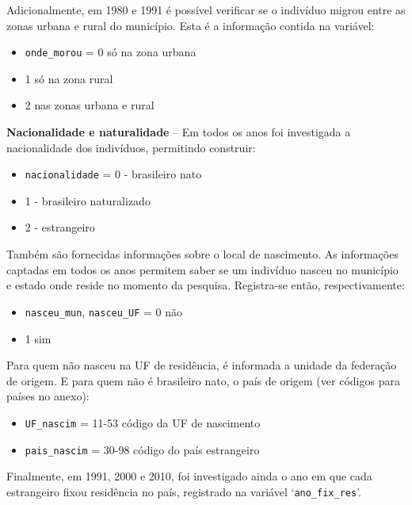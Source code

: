 \documentclass[12pt,a4paper]{article}
\newcommand{\vr}[1]{\texttt{#1}}
\begin{document}
Adicionalmente, em 1980 e 1991 é possível verificar se o indivíduo migrou entre as zonas urbana e rural do município. Esta é a informação contida na variável:
\begin{itemize}
  \item \vr{onde\_morou} = 0 só na zona urbana
  \item 1 só na zona rural
  \item 2 nas zonas urbana e rural
\end{itemize}

\textbf{Nacionalidade e naturalidade} -- Em todos os anos foi investigada a nacionalidade dos indivíduos, permitindo construir:
\begin{itemize}
  \item \vr{nacionalidade} = 0 - brasileiro nato
  \item 1 - brasileiro naturalizado
  \item 2 - estrangeiro
\end{itemize}

Também são fornecidas informações sobre o local de nascimento. As informações captadas em todos os anos permitem saber se um indivíduo nasceu no município e estado onde reside no momento da pesquisa. Registra-se então, respectivamente:
\begin{itemize}
  \item \vr{nasceu\_mun}, \vr{nasceu\_UF} = 0 não
  \item 1 sim
\end{itemize}

Para quem não nasceu na UF de residência, é informada a unidade da federação de origem. E para quem não é brasileiro nato, o país de origem (ver códigos para países no anexo):
\begin{itemize}
  \item \vr{UF\_nascim} = 11-53 código da UF de nascimento
  \item \vr{pais\_nascim} = 30-98 código do país estrangeiro
\end{itemize}

Finalmente, em 1991, 2000 e 2010, foi investigado ainda o ano em que cada estrangeiro fixou residência no país, registrado na variável ‘\vr{ano\_fix\_res}’.
\end{document}
